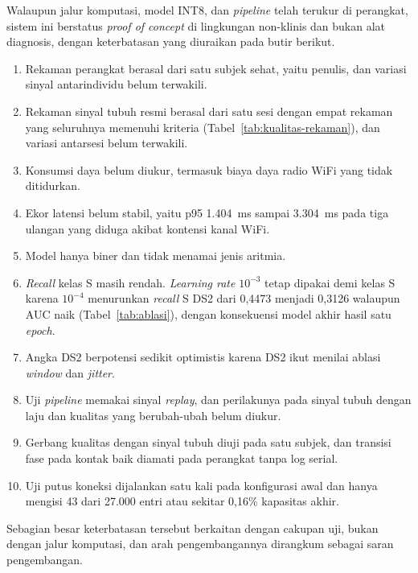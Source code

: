 Walaupun jalur komputasi, model INT8, dan \textit{pipeline} telah terukur di perangkat, sistem ini berstatus \textit{proof of concept} di lingkungan non-klinis dan bukan alat diagnosis, dengan keterbatasan yang diuraikan pada butir berikut.
\begin{enumerate}
  \item Rekaman perangkat berasal dari satu subjek sehat, yaitu penulis, dan variasi sinyal antarindividu belum terwakili.
  \item Rekaman sinyal tubuh resmi berasal dari satu sesi dengan empat rekaman yang seluruhnya memenuhi kriteria (Tabel~\ref{tab:kualitas-rekaman}), dan variasi antarsesi belum terwakili.
  \item Konsumsi daya belum diukur, termasuk biaya daya radio WiFi yang tidak ditidurkan.
  \item Ekor latensi belum stabil, yaitu p95 1.404~ms sampai 3.304~ms pada tiga ulangan yang diduga akibat kontensi kanal WiFi.
  \item Model hanya biner dan tidak menamai jenis aritmia.
  \item \textit{Recall} kelas S masih rendah. \textit{Learning rate} $10^{-3}$ tetap dipakai demi kelas S karena $10^{-4}$ menurunkan \textit{recall} S DS2 dari 0,4473 menjadi 0,3126 walaupun AUC naik (Tabel~\ref{tab:ablasi}), dengan konsekuensi model akhir hasil satu \textit{epoch}.
  \item Angka DS2 berpotensi sedikit optimistis karena DS2 ikut menilai ablasi \textit{window} dan \textit{jitter}.
  \item Uji \textit{pipeline} memakai sinyal \textit{replay}, dan perilakunya pada sinyal tubuh dengan laju dan kualitas yang berubah-ubah belum diukur.
  \item Gerbang kualitas dengan sinyal tubuh diuji pada satu subjek, dan transisi fase pada kontak baik diamati pada perangkat tanpa log serial.
  \item Uji putus koneksi dijalankan satu kali pada konfigurasi awal dan hanya mengisi 43 dari 27.000 entri atau sekitar 0,16\% kapasitas akhir.
\end{enumerate}

Sebagian besar keterbatasan tersebut berkaitan dengan cakupan uji, bukan dengan jalur komputasi, dan arah pengembangannya dirangkum sebagai saran pengembangan.

